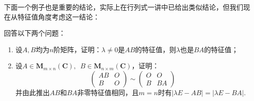 下面一个例子也是重要的结论，实际上在行列式一讲中已给出类似结论，但我们现在从特征值角度考虑这一结论：
\begin{example}
    回答以下两个问题：
    \begin{enumerate}
        \item \label{item:18:特征值相同:1}
              设$A,B$均为$n$阶矩阵，证明：$\lambda\neq 0$是$AB$的特征值，则$\lambda$也是$BA$的特征值；

        \item \label{item:18:特征值相同:2}
              设$A\in \mathbf{M}_{m\times n}(\mathbf{C}),\enspace B\in \mathbf{M}_{n\times m}(\mathbf{C})$，证明：
              \[ \begin{pmatrix}
                      AB & O \\ B & O
                  \end{pmatrix}\sim\begin{pmatrix}
                      O & O \\ B & BA
                  \end{pmatrix} \]
              并由此推出$AB$和$BA$非零特征值相同，且$m=n$时有$|\lambda E-AB|=|\lambda E-BA|$.
    \end{enumerate}
\end{example}

